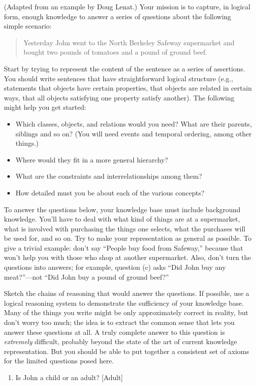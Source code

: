 \begin{exercise}
(Adapted from an example by Doug Lenat.)
Your mission is to capture, in logical form, enough knowledge to answer
a series of questions about the following simple scenario:
\begin{quote}
Yesterday John went to the North Berkeley Safeway supermarket and bought two
pounds of tomatoes and a pound of ground beef.
\end{quote}
Start by trying to represent the content of the sentence as a series
of assertions.  You should write sentences that have straightforward
logical structure (e.g., statements that objects have certain
properties, that objects are related in certain ways, that all objects
satisfying one property satisfy another).  The following might help you
get started:
\begin{itemize}
\item     Which classes, objects, and relations would you need?
What are their parents, siblings and so on?
(You will need events and temporal ordering, among other things.)
\item     Where would they fit in a more general hierarchy?
\item     What are the constraints and interrelationships among them?
\item     How detailed must you be about each of the various concepts?
\end{itemize}
To answer the questions below, your knowledge base must include
background knowledge. You'll have to deal with what kind of things are
at a supermarket, what is involved with purchasing the things one
selects, what the purchases will be used for, and so on.  Try to make your
representation as general as possible. To give a trivial example:
don't say ``People buy food from Safeway,'' because that won't help
you with those who shop at another supermarket.  Also, don't turn the
questions into answers; for example, question (c) asks ``Did John buy
any meat?''---not ``Did John buy a pound of ground beef?''

Sketch the chains of reasoning that would answer the questions.  If
possible, use a logical reasoning system to demonstrate the
sufficiency of your knowledge base.  Many of the things you write
might be only approximately correct in reality, but don't worry too
much; the idea is to extract the common sense that lets you answer
these questions at all. A truly complete answer to this question is
{\em extremely} difficult, probably beyond the state of the art of
current knowledge representation. But you should be able to put
together a consistent set of axioms for the limited questions posed
here.
\begin{enumerate}
\item Is John a child or an adult?   [Adult]


\end{enumerate}
\end{exercise}
